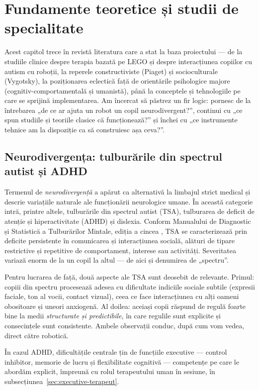 \chapter{Fundamente teoretice și studii de specialitate}
\label{cap:preliminarii}

Acest capitol trece în revistă literatura care a stat la baza proiectului — de la studiile clinice despre terapia bazată pe LEGO și despre interacțiunea copiilor cu autism cu roboții, la reperele constructiviste (Piaget) și socioculturale (Vygotsky), la poziționarea eclectică față de orientările psihologice majore (cognitiv-comportamentală și umanistă), până la conceptele și tehnologiile pe care se sprijină implementarea. Am încercat să păstrez un fir logic: pornesc de la întrebarea „de ce ar ajuta un robot un copil neurodivergent?”, continui cu „ce spun studiile și teoriile clasice că funcționează?” și închei cu „ce instrumente tehnice am la dispoziție ca să construiesc așa ceva?”.

\section{Neurodivergența: tulburările din spectrul autist și ADHD}

Termenul de \emph{neurodivergență} a apărut ca alternativă la limbajul strict medical și descrie variațiile naturale ale funcționării neurologice umane. În această categorie intră, printre altele, tulburările din spectrul autist (TSA), tulburarea de deficit de atenție și hiperactivitate (ADHD) și dislexia. Conform Manualului de Diagnostic și Statistică a Tulburărilor Mintale, ediția a cincea \cite{apa2013}, TSA se caracterizează prin deficite persistente în comunicarea și interacțiunea socială, alături de tipare restrictive și repetitive de comportament, interese sau activități. Severitatea variază enorm de la un copil la altul — de aici și denumirea de „spectru”.

Pentru lucrarea de față, două aspecte ale TSA sunt deosebit de relevante. Primul: copiii din spectru procesează adesea cu dificultate indiciile sociale subtile (expresii faciale, ton al vocii, contact vizual), ceea ce face interacțiunea cu alți oameni obositoare și uneori anxiogenă. Al doilea: aceiași copii răspund de regulă foarte bine la medii \emph{structurate și predictibile}, în care regulile sunt explicite și consecințele sunt consistente. Ambele observații conduc, după cum vom vedea, direct către robotică.

În cazul ADHD, dificultățile centrale țin de funcțiile executive — control inhibitor, memorie de lucru și flexibilitate cognitivă \cite{diamond2013} — competențe pe care le abordăm explicit, împreună cu rolul terapeutului uman în sesiune, în subsecțiunea~\ref{sec:executive-terapeut}.

